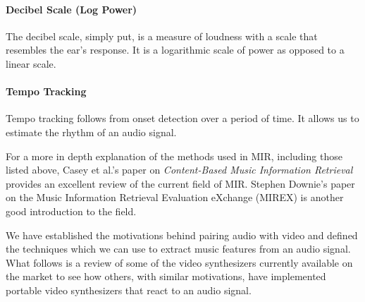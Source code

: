 \documentclass[../initial_thesis.tex]{subfiles}
\begin{document}
\paragraph{Decibel Scale (Log Power)}
The decibel scale, simply put, is a measure of loudness with a scale that resembles the ear's response. It is a logarithmic scale of power as opposed to a linear scale.

\paragraph{Tempo Tracking}
Tempo tracking follows from onset detection over a period of time. It allows us to estimate the rhythm of an audio signal.\\
\par

For a more in depth explanation of the methods used in MIR, including those listed above, Casey et al.'s paper on \textit{Content-Based Music Information Retrieval} \cite{Casey2008} provides an excellent review of the current field of MIR. Stephen Downie's paper \cite{Downie} on the Music Information Retrieval Evaluation eXchange (MIREX) is another good introduction to the field. \par

We have established the motivations behind pairing audio with video and defined the techniques which we can use to extract music features from an audio signal. What follows is a review of some of the video synthesizers currently available on the market to see how others, with similar motivations, have implemented portable video synthesizers that react to an audio signal.

\end{document}

